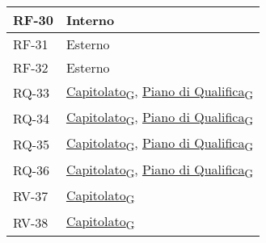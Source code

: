 \begin{longtable}{|>{\centering\arraybackslash}m{}|>{\centering\arraybackslash}m{}|}
	RF-30              & Interno                                                                                                                                                                                                                                              \\\hline
	RF-31              & Esterno                                                                                                                                                                                                                                              \\\hline
	RF-32              & Esterno                                                                                                                                                                                                                                              \\\hline
	RQ-33              & \href{https://7last.github.io/docs/rtb/documentazione-interna/glossario\#capitolato}{Capitolato\textsubscript{G}}, \href{https://7last.github.io/docs/rtb/documentazione-interna/glossario\#piano-di-qualifica}{Piano di Qualifica\textsubscript{G}} \\\hline
	RQ-34              & \href{https://7last.github.io/docs/rtb/documentazione-interna/glossario\#capitolato}{Capitolato\textsubscript{G}}, \href{https://7last.github.io/docs/rtb/documentazione-interna/glossario\#piano-di-qualifica}{Piano di Qualifica\textsubscript{G}} \\\hline
	RQ-35              & \href{https://7last.github.io/docs/rtb/documentazione-interna/glossario\#capitolato}{Capitolato\textsubscript{G}}, \href{https://7last.github.io/docs/rtb/documentazione-interna/glossario\#piano-di-qualifica}{Piano di Qualifica\textsubscript{G}} \\\hline
	RQ-36              & \href{https://7last.github.io/docs/rtb/documentazione-interna/glossario\#capitolato}{Capitolato\textsubscript{G}}, \href{https://7last.github.io/docs/rtb/documentazione-interna/glossario\#piano-di-qualifica}{Piano di Qualifica\textsubscript{G}} \\\hline
	RV-37              & \href{https://7last.github.io/docs/rtb/documentazione-interna/glossario\#capitolato}{Capitolato\textsubscript{G}}                                                                                                                                    \\\hline
	RV-38              & \href{https://7last.github.io/docs/rtb/documentazione-interna/glossario\#capitolato}{Capitolato\textsubscript{G}}                                                                                                                                    \\\hline

\end{longtable}
